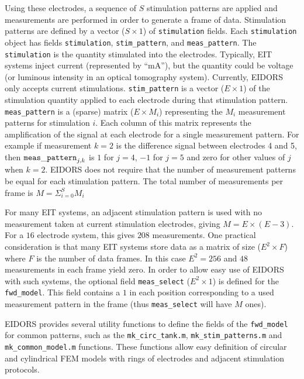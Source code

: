\documentclass[12pt]{iopart}
\begin{document}
Using these electrodes, a sequence of $S$ stimulation
patterns are applied and measurements are performed
in order to generate a frame of data.
Stimulation patterns are defined by a vector
($S\times1$) of {\tt stimulation} fields. Each
{\tt stimulation} object has fields
{\tt stimulation}, 
{\tt stim\_pattern}, and
{\tt meas\_pattern}. The {\tt stimulation} is
the quantity stimulated into the electrodes. Typically,
EIT systems inject current (represented by ``mA''),
but the quantity could be voltage (or luminous
intensity in an optical tomography system). Currently,
EIDORS only accepts current stimulations.
{\tt stim\_pattern} is a vector ($E\times1$)
of the stimulation quantity applied to each electrode
during that stimulation pattern.
{\tt meas\_pattern} is a (sparse) matrix ($E{\times}M_i$) 
representing the $M_i$ measurement patterns for
stimulation $i$. Each column of this matrix represents
the amplification of the signal at each electrode for
a single measurement pattern. For example if measurement
$k=2$ is the difference signal between electrodes 4 and 5,
then ${\tt meas\_pattern}_{j,k}$ is $1$ for $j=4$,  $-1$
for $j=5$ and zero for other values of $j$ when $k=2$.
EIDORS does not require that the number of measurement
patterns be equal for each stimulation pattern. 
The total number of measurements per frame is
$ M = \Sigma_{i=0}^{S} M_i$

For many EIT systems, an adjacent stimulation
pattern is used with no measurement taken at current
stimulation electrodes, giving $M = E\times(E-3)$.
For a $16$ electrode system, this gives $208$
measurements. One practical consideration is that
many EIT systems store data as a matrix of size
($E^2{\times}F$) where $F$ is the number of data
frames. In this case $E^2= 256$ and $48$ measurements
in each frame yield zero. In order to allow easy 
use of EIDORS with such systems, the optional
field {\tt meas\_select} ($E^2\times1$) is defined
for the {\tt fwd\_model}. This field contains a 
$1$ in each position corresponding to a used measurement
pattern in the frame (thus {\tt meas\_select} will
have $M$ ones).

EIDORS provides several utility functions to define
the fields of the {\tt fwd\_model} for common 
patterns, such as the
{\tt mk\_circ\_tank.m},
{\tt mk\_stim\_patterns.m} and
{\tt mk\_common\_model.m} functions. These functions
allow easy definition of circular and cylindrical
FEM models with rings of electrodes and adjacent
stimulation protocols.
\end{document}
